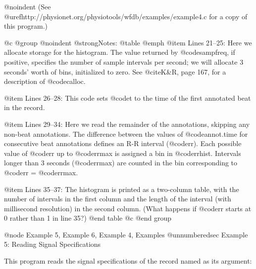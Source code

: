 {{{{{{{{{{{{{{@noindent
(See @uref{http://physionet.org/physiotools/wfdb/examples/example4.c}
for a copy of this program.)

@c @group
@noindent
@strong{Notes:}
@table @emph
@item Lines 21--25:
Here we allocate storage for the histogram.  The value returned by
@code{sampfreq}, if positive, specifies the number of sample intervals
per second; we will allocate 3 seconds' worth of bins, initialized to
zero.  See @cite{K&R}, page 167, for a description of
@code{calloc}.

@item Lines 26--28:
This code sets @code{t} to the time of the first annotated beat in the
record.

@item Lines 29--34:
Here we read the remainder of the annotations, skipping any non-beat
annotations.  The difference between the values of @code{annot.time} for
consecutive beat annotations defines an R-R interval (@code{rr}).  Each
possible value of @code{rr} up to @code{rrmax} is assigned a bin in
@code{rrhist}.  Intervals longer than 3 seconds (@code{rrmax}) are
counted in the bin corresponding to @code{rr} = @code{rrmax}.

@item Lines 35--37:
The histogram is printed as a two-column table, with the number of
intervals in the first column and the length of the interval (with
millisecond resolution) in the second column. (What happens if
@code{rr} starts at 0 rather than 1 in line 35?)
@end table
@c @end group

@node     Example 5, Example 6, Example 4, Examples
@unnumberedsec Example 5: Reading Signal Specifications

This program reads the signal specifications of the record named as its
argument:

}}}}}}}}}}}}}}

